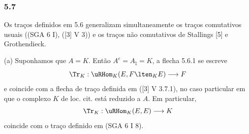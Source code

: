 \subsubsection*{5.7}

Os traços definidos em 5.6 generalizam simultaneamente os traços comutativos usuais ((SGA 6 I), ([3] V 3)) e os traços não comutativos de Stallings [5] e Grothendieck.

(a) Suponhamos que $A=K$. Então $A^e=A_\natural=K$, a flecha 5.6.1 se escreve
\[
\Tr_K:\uRHom_K(E,F\lten_KE)\longrightarrow F
\]
e coincide com a flecha de traço definida em ([3] V 3.7.1), no caso particular em que o complexo $K$ de loc. cit. está reduzido a $A$. Em particular,
\[
\Tr_K:\uRHom_K(E,E)\longrightarrow K
\]
coincide com o traço definido em (SGA 6 I 8).

